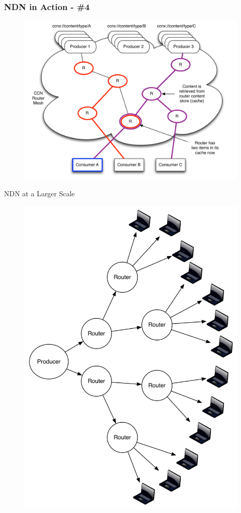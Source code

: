 \documentclass[handout]{beamer}
\begin{document}
\begin{frame}
	\frametitle{NDN in Action - \#4}
	\begin{figure}[h]
		\includegraphics[scale=0.4]{img/ccn_img4.pdf}
	\end{figure}
\end{frame}

\begin{frame}{NDN at a Larger Scale}
	\begin{figure}[h]
		\includegraphics[scale=0.3]{img/ndn_dist.pdf}
	\end{figure}
\end{frame}
\end{document}
